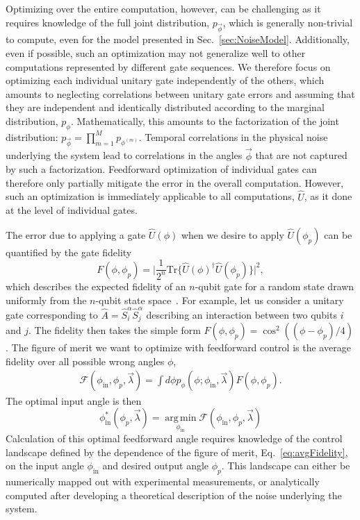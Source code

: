 \documentclass[prx,aps,twocolumn,showpacs,superscriptaddress,10pt]{revtex4-1}
\begin{document}
Optimizing over the entire computation, however, can be challenging as it requires knowledge of the full joint distribution, $p_{\vec{\phi}}$, which is generally non-trivial to compute, even for the model presented in Sec.~\ref{sec:NoiseModel}. Additionally, even if possible, such an optimization may not generalize well to other computations represented by different gate sequences. We therefore focus on optimizing each individual unitary gate independently of the others, which amounts to neglecting correlations between unitary gate errors and assuming that they are independent and identically distributed according to the marginal distribution, $p_{\phi}$. Mathematically, this amounts to the factorization of the joint distribution: $p_{\vec{\phi}}=\prod_{m=1}^{M}p_{\phi^{(m)}}$. Temporal correlations in the physical noise underlying the system lead to correlations in the angles $\vec{\phi}$ that are not captured by such a factorization. Feedforward optimization of individual gates can therefore only partially mitigate the error in the overall computation. However, such an optimization is immediately applicable to all computations, $\hat{U}$, as it done at the level of individual gates.

The error due to applying a gate $\hat{U}\left(\phi\right)$ when we desire to apply $\hat{U}\left(\phi_{p}\right)$ can be quantified by the gate fidelity
\begin{equation}\label{eq:HaarFidelity}
F\left(\phi,\phi_{p}\right)=\lvert\frac{1}{2^{n}}\textrm{Tr}\{\hat{U}\left(\phi\right)^{\dagger}\hat{U}\left(\phi_{p}\right)\}\rvert^2,
\end{equation}
which describes the expected fidelity of an  $n$-qubit gate for a random state drawn uniformly from the $n$-qubit state space~\cite{Nielsen2002}. For example, let us consider a unitary gate corresponding to $\hat{A}=\hat{S}_{i}^{\alpha}\hat{S}_{j}^{\alpha}$ describing an interaction between two qubits $i$ and $j$. The fidelity then takes the simple form $F\left(\phi,\phi_{p}\right)=\cos^{2}\left((\phi-\phi_{p})/4\right)$. The figure of merit we want to optimize with feedforward control is the average fidelity over all possible wrong angles $\phi$,
\begin{align}\label{eq:avgFidelity}
\mathcal{F}\left(\phi_\textrm{in},\phi_{p},\vec{\lambda}\right) = \int d\phi p_{\phi}\left(\phi;\phi_\textrm{in},\vec{\lambda}\right) F\left(\phi,\phi_{p}\right).
\end{align}
The optimal input angle is then 
\begin{equation}\label{eq:optInputAngle}
\phi_\textrm{in}^{*}\left(\phi_{p},\vec{\lambda}\right)=\operatorname*{arg\,min}_{\phi_\textrm{in}} \mathcal{F}\left(\phi_\textrm{in},\phi_{p},\vec{\lambda}\right)
\end{equation}
Calculation of this optimal feedforward angle requires knowledge of the control landscape defined by the dependence of the figure of merit, Eq.~\eqref{eq:avgFidelity}, on the input angle $\phi_\textrm{in}$ and desired output angle $\phi_{p}$.  This landscape can either be numerically mapped out with experimental measurements, or analytically computed after developing a theoretical description of the noise underlying the system.
\end{document}
